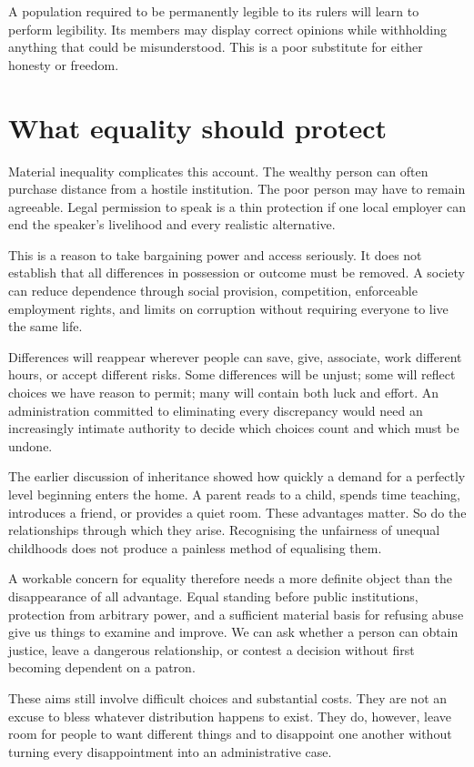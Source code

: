 \documentclass[12pt,a4paper]{book}
\begin{document}
A population required to be permanently legible to its rulers will learn to perform legibility. Its members may display correct opinions while withholding anything that could be misunderstood. This is a poor substitute for either honesty or freedom.

\section*{What equality should protect}

Material inequality complicates this account. The wealthy person can often purchase distance from a hostile institution. The poor person may have to remain agreeable. Legal permission to speak is a thin protection if one local employer can end the speaker's livelihood and every realistic alternative.

This is a reason to take bargaining power and access seriously. It does not establish that all differences in possession or outcome must be removed. A society can reduce dependence through social provision, competition, enforceable employment rights, and limits on corruption without requiring everyone to live the same life.

Differences will reappear wherever people can save, give, associate, work different hours, or accept different risks. Some differences will be unjust; some will reflect choices we have reason to permit; many will contain both luck and effort. An administration committed to eliminating every discrepancy would need an increasingly intimate authority to decide which choices count and which must be undone.

The earlier discussion of inheritance showed how quickly a demand for a perfectly level beginning enters the home. A parent reads to a child, spends time teaching, introduces a friend, or provides a quiet room. These advantages matter. So do the relationships through which they arise. Recognising the unfairness of unequal childhoods does not produce a painless method of equalising them.

A workable concern for equality therefore needs a more definite object than the disappearance of all advantage. Equal standing before public institutions, protection from arbitrary power, and a sufficient material basis for refusing abuse give us things to examine and improve. We can ask whether a person can obtain justice, leave a dangerous relationship, or contest a decision without first becoming dependent on a patron.

These aims still involve difficult choices and substantial costs. They are not an excuse to bless whatever distribution happens to exist. They do, however, leave room for people to want different things and to disappoint one another without turning every disappointment into an administrative case.
\end{document}
